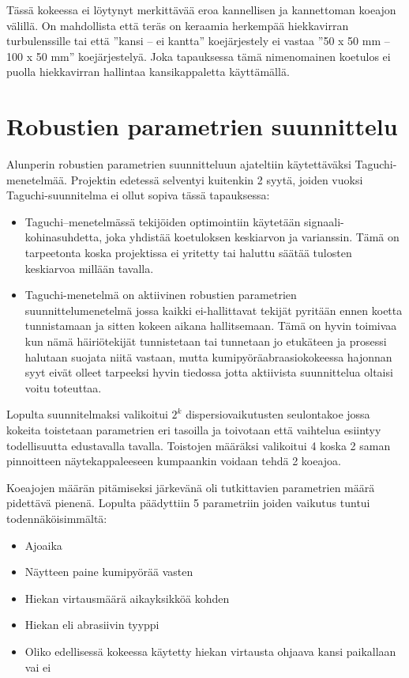 \documentclass[12pt,a4paper,finnish]{tutthesis}
\begin{document}
Tässä kokeessa ei löytynyt merkittävää eroa kannellisen ja kannettoman koeajon välillä.
On mahdollista että teräs on keraamia herkempää hiekkavirran turbulenssille tai että ”kansi – ei kantta” koejärjestely ei vastaa ”50 x 50 mm – 100 x 50 mm” koejärjestelyä. Joka tapauksessa tämä nimenomainen koetulos ei puolla hiekkavirran hallintaa kansikappaletta käyttämällä.

\section{Robustien parametrien suunnittelu}

Alunperin robustien parametrien suunnitteluun ajateltiin käytettäväksi
Taguchi-menetelmää. Projektin edetessä selventyi kuitenkin 2 syytä, joiden
vuoksi Taguchi-suunnitelma ei ollut sopiva tässä tapauksessa:

\begin{itemize}
  \item Taguchi–menetelmässä tekijöiden optimointiin käytetään
signaali-kohinasuhdetta, joka yhdistää koetuloksen keskiarvon ja varianssin. Tämä on tarpeetonta koska projektissa ei
yritetty tai haluttu säätää tulosten keskiarvoa millään tavalla.
  \item Taguchi-menetelmä on aktiivinen robustien parametrien suunnittelumenetelmä jossa kaikki ei-hallittavat tekijät pyritään ennen koetta tunnistamaan ja sitten kokeen aikana hallitsemaan. Tämä on hyvin toimivaa kun nämä häiriötekijät tunnistetaan tai tunnetaan jo etukäteen ja prosessi halutaan suojata niitä vastaan, mutta kumipyöräabraasiokokeessa
hajonnan syyt eivät olleet tarpeeksi hyvin tiedossa jotta aktiivista suunnittelua
oltaisi voitu toteuttaa.
\end{itemize}

Lopulta suunnitelmaksi valikoitui $2^k$ dispersiovaikutusten seulontakoe jossa kokeita toistetaan parametrien eri tasoilla ja toivotaan että vaihtelua esiintyy todellisuutta edustavalla tavalla. Toistojen määräksi valikoitui 4 koska 2
saman pinnoitteen näytekappaleeseen kumpaankin voidaan tehdä 2 koeajoa.

Koeajojen määrän pitämiseksi järkevänä oli tutkittavien parametrien määrä pidettävä pienenä. Lopulta päädyttiin 5 parametriin joiden vaikutus tuntui todennäköisimmältä:

\begin{itemize}
  \item Ajoaika
  \item Näytteen paine kumipyörää vasten
  \item Hiekan virtausmäärä aikayksikköä kohden
  \item Hiekan eli abrasiivin tyyppi
  \item Oliko edellisessä kokeessa käytetty hiekan virtausta ohjaava kansi paikallaan vai ei
\end{itemize}
\end{document}
